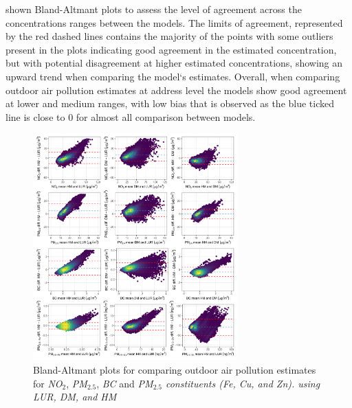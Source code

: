 \documentclass{article}
\begin{document}
\newpage


\textbf{} shown Bland-Altmant plots to assess the level of agreement across the concentrations ranges between the models. The limits of agreement, represented by the red dashed lines  contains the majority of the points with some outliers present in the plots indicating good agreement in the estimated concentration, but with potential disagreement at higher estimated concentrations, showing an upward trend when comparing the model`s estimates. Overall, when comparing outdoor air pollution estimates at address level the models show good agreement at lower and medium ranges, with low bias that is observed as the blue ticked line is close to 0 for almost all comparison between models. 

\captionsetup[figure]{skip=6pt}
\begin{figure}[!h]
\includegraphics[width=0.7\textwidth]{figures/final_bland_altmant.png}
\caption{Bland-Altmant plots for comparing outdoor air pollution estimates for \textit{NO$_2$}, \textit{PM$_{2.5}$}, \textit{BC} and \textit{PM$_{2.5}$ constituents (Fe, Cu, and Zn). using LUR, DM, and HM}}
\label{fig6}
\end{figure}
\vspace*{-\baselineskip}
\end{document}
